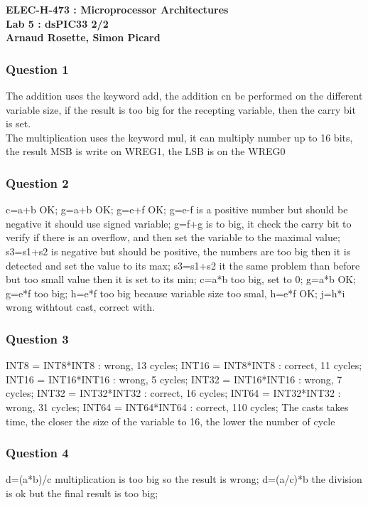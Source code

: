 \documentclass[a4paper,10pt]{article}
\begin{document}
\begin{center}
\textbf{ELEC-H-473 : Microprocessor Architectures\\ Lab 5 : dsPIC33 2/2\\Arnaud Rosette, Simon Picard}
\end{center}

\subsubsection*{Question 1}
The addition uses the keyword add, the addition cn be performed on the different variable size, if the result is too big for the recepting variable, then the carry bit is set.\\
The multiplication uses the keyword mul, it can multiply number up to 16 bits, the result MSB is write on WREG1, the LSB is on the WREG0

\subsubsection*{Question 2}
c=a+b OK; g=a+b OK; g=e+f OK; g=e-f is a positive number but should be negative it should use signed variable; g=f+g is to big, it check the carry bit to verify if there is an overflow, and then set the variable to the maximal value; s3=s1+s2 is negative but should be positive, the numbers are too big then it is detected and set the value to its max; s3=s1+s2 it the same problem than before but too small value then it is set to its min; c=a*b too big, set to 0; g=a*b OK; g=e*f too big; h=e*f too big because variable size too smal, h=e*f OK; j=h*i wrong withtout cast, correct with.

\subsubsection*{Question 3}
INT8 = INT8*INT8 : wrong, 13 cycles; 
INT16 = INT8*INT8 : correct, 11 cycles; 
INT16 = INT16*INT16 : wrong, 5 cycles; 
INT32 = INT16*INT16 : wrong, 7 cycles; 
INT32 = INT32*INT32 : correct, 16 cycles; 
INT64 = INT32*INT32 : wrong, 31 cycles; 
INT64 = INT64*INT64 : correct, 110 cycles; 
The casts takes time, the closer the size of the variable to 16, the lower the number of cycle

\subsubsection*{Question 4}
d=(a*b)/c multiplication is too big so the result is wrong; 
d=(a/c)*b the division is ok but the final result is too big; 
\end{document}
